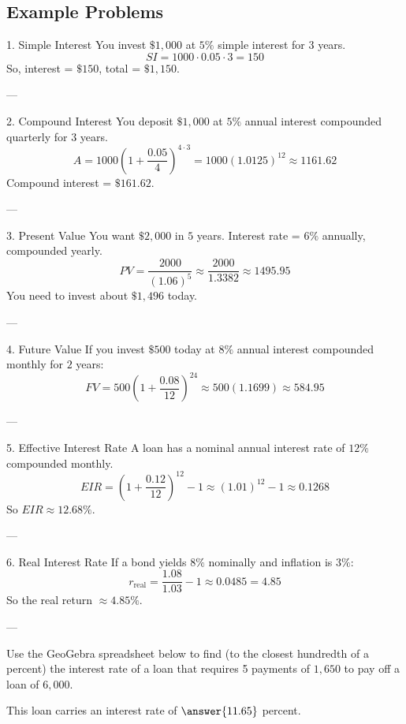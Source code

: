 \documentclass[handout,space,nooutcomes]{ximera}
\begin{document}
\subsection{Example Problems}

1. Simple Interest
You invest $\$1{,}000$ at $5\%$ simple interest for $3$ years.
\[
SI = 1000 \cdot 0.05 \cdot 3 = 150
\]
So, interest = $\$150$, total = $\$1{,}150$.

---

2. Compound Interest
You deposit $\$1{,}000$ at $5\%$ annual interest compounded quarterly for $3$ years.
\[
A = 1000 \left(1 + \frac{0.05}{4}\right)^{4 \cdot 3} = 1000 (1.0125)^{12} \approx 1161.62
\]
Compound interest = $\$161.62$.

---

3. Present Value
You want $\$2{,}000$ in $5$ years. Interest rate = $6\%$ annually, compounded yearly.
\[
PV = \frac{2000}{(1.06)^5} \approx \frac{2000}{1.3382} \approx 1495.95
\]
You need to invest about $\$1{,}496$ today.

---

4. Future Value
If you invest $\$500$ today at $8\%$ annual interest compounded monthly for $2$ years:
\[
FV = 500 \left(1 + \frac{0.08}{12}\right)^{24} \approx 500 (1.1699) \approx 584.95
\]

---

5. Effective Interest Rate
A loan has a nominal annual interest rate of $12\%$ compounded monthly.
\[
EIR = \left(1 + \frac{0.12}{12}\right)^{12} - 1 \approx (1.01)^{12} - 1 \approx 0.1268
\]
So $EIR \approx 12.68\%$.

---

6. Real Interest Rate
If a bond yields $8\%$ nominally and inflation is $3\%$:
\[
r_{\text{real}} = \frac{1.08}{1.03} - 1 \approx 0.0485 = 4.85%
\]
So the real return $\approx 4.85\%$.

---

\begin{problem}
Use the GeoGebra spreadsheet below to find (to the closest hundredth of a percent) the interest rate of a loan that requires 5 payments of $1{,}650$ to pay off a loan of $6{,}000$.  
\begin{center}
\end{center}
This loan carries an interest rate of $\answer{11.65}$ percent.  
\end{problem}
\end{document}

